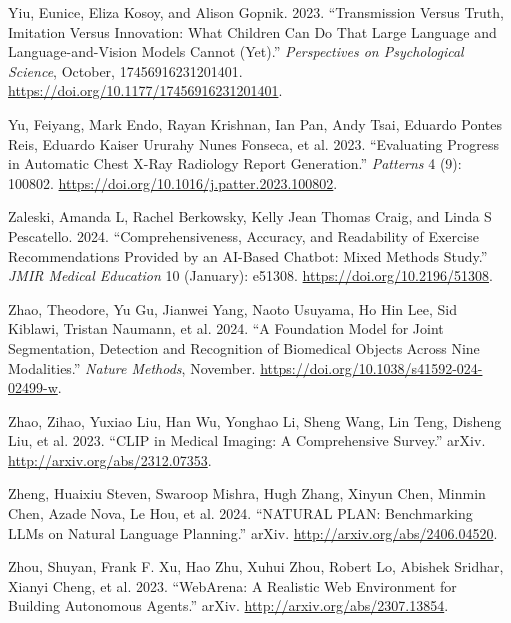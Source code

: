 \documentclass[
  Letterpaper,
]{scrbook}
\newlength{\cslhangindent}
\newenvironment{CSLReferences}[2] %
 {\begin{list}{}{%
  \setlength{\itemindent}{0pt}
  \setlength{\leftmargin}{0pt}
  \setlength{\parsep}{0pt}
  \ifodd #1
   \setlength{\leftmargin}{\cslhangindent}
   \setlength{\itemindent}{-1\cslhangindent}
  \fi
  \setlength{\itemsep}{#2\baselineskip}}}
 {\end{list}}
\begin{document}
\begin{CSLReferences}{1}{0}
Yiu, Eunice, Eliza Kosoy, and Alison Gopnik. 2023. {``Transmission
{Versus} {Truth}, {Imitation} {Versus} {Innovation}: {What} {Children}
{Can} {Do} {That} {Large} {Language} and {Language}-and-{Vision}
{Models} {Cannot} ({Yet}).''} \emph{Perspectives on Psychological
Science}, October, 17456916231201401.
\url{https://doi.org/10.1177/17456916231201401}.

Yu, Feiyang, Mark Endo, Rayan Krishnan, Ian Pan, Andy Tsai, Eduardo
Pontes Reis, Eduardo Kaiser Ururahy Nunes Fonseca, et al. 2023.
{``Evaluating Progress in Automatic Chest {X}-Ray Radiology Report
Generation.''} \emph{Patterns} 4 (9): 100802.
\url{https://doi.org/10.1016/j.patter.2023.100802}.

Zaleski, Amanda L, Rachel Berkowsky, Kelly Jean Thomas Craig, and Linda
S Pescatello. 2024. {``Comprehensiveness, {Accuracy}, and {Readability}
of {Exercise} {Recommendations} {Provided} by an {AI}-{Based} {Chatbot}:
{Mixed} {Methods} {Study}.''} \emph{JMIR Medical Education} 10
(January): e51308. \url{https://doi.org/10.2196/51308}.

Zhao, Theodore, Yu Gu, Jianwei Yang, Naoto Usuyama, Ho Hin Lee, Sid
Kiblawi, Tristan Naumann, et al. 2024. {``A Foundation Model for Joint
Segmentation, Detection and Recognition of Biomedical Objects Across
Nine Modalities.''} \emph{Nature Methods}, November.
\url{https://doi.org/10.1038/s41592-024-02499-w}.

Zhao, Zihao, Yuxiao Liu, Han Wu, Yonghao Li, Sheng Wang, Lin Teng,
Disheng Liu, et al. 2023. {``{CLIP} in {Medical} {Imaging}: {A}
{Comprehensive} {Survey}.''} arXiv.
\url{http://arxiv.org/abs/2312.07353}.

Zheng, Huaixiu Steven, Swaroop Mishra, Hugh Zhang, Xinyun Chen, Minmin
Chen, Azade Nova, Le Hou, et al. 2024. {``{NATURAL} {PLAN}:
{Benchmarking} {LLMs} on {Natural} {Language} {Planning}.''} arXiv.
\url{http://arxiv.org/abs/2406.04520}.

Zhou, Shuyan, Frank F. Xu, Hao Zhu, Xuhui Zhou, Robert Lo, Abishek
Sridhar, Xianyi Cheng, et al. 2023. {``{WebArena}: {A} {Realistic} {Web}
{Environment} for {Building} {Autonomous} {Agents}.''} arXiv.
\url{http://arxiv.org/abs/2307.13854}.

\end{CSLReferences}


\backmatter
\end{document}
